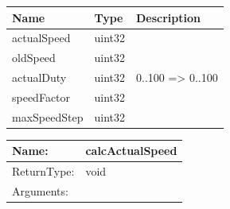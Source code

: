 \begin{par}

\end{par}


\begin{tabular}[ht]{|l|l|p{8cm}|}
\hline
\textbf{Name} & \textbf{Type} & \textbf{Description}\\
\hline
actualSpeed & uint32 & \\
\hline
oldSpeed & uint32 & \\
\hline
actualDuty & uint32 & %
0..100 => 0..100%
\\
\hline
speedFactor & uint32 & \\
\hline
maxSpeedStep & uint32 & \\
\hline
\end{tabular}

\begin{tabular}[ht]{|l|l|}
\hline		
	Name: & calcActualSpeed\\
	\hline
	ReturnType: &  void\\
	\hline
	Arguments: & \\
	\hline
\end{tabular}
\newline\newline\newline
